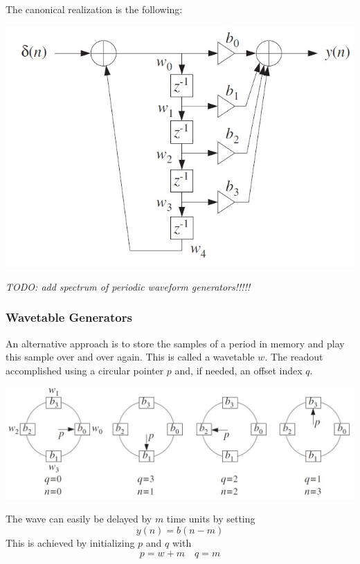The canonical realization is the following:
\begin{center}
	\includegraphics[width=\linewidth]{images/SignProcApp_PeriodicWaveFormGen.jpg}
\end{center}

\emph{TODO: add spectrum of periodic waveform generators!!!!!}

\subsubsection{Wavetable Generators}
An alternative approach is to store the samples of a period in memory and
play this sample over and over again. This is called a wavetable $w$. The readout
accomplished using a circular pointer $p$ and, if needed, an offset index $q$.

\begin{center}
	\includegraphics[width=\linewidth]{images/SignProcApp_Wavetable.jpg}
\end{center}

The wave can easily be delayed by $m$ time units by setting
\begin{equation*}
	y(n) = b(n-m)
\end{equation*}
This is achieved by initializing $p$ and $q$ with 
\begin{equation*}
	p = w+m \quad q=m
\end{equation*}

